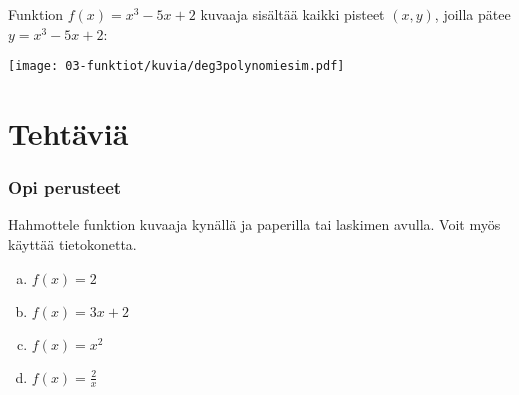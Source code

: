 \begin{esimerkki}
Funktion $f(x) = x^3-5x+2$ kuvaaja sisältää kaikki pisteet $(x, y)$, joilla pätee $y = x^3-5x+2$:
\begin{center}
\texttt{[image: 03-funktiot/kuvia/deg3polynomiesim.pdf]}
\end{center}
\end{esimerkki}

\section*{Tehtäviä}

\subsubsection*{Opi perusteet}

\begin{tehtava}
Hahmottele funktion kuvaaja kynällä ja paperilla tai laskimen avulla. Voit myös käyttää tietokonetta.
\begin{enumerate}[a)]
\item $f(x) = 2$
\item $f(x) = 3x+2$
\item $f(x) = x^2$
\item $f(x) = \frac{2}{x}$
\end{enumerate}

\end{tehtava}
